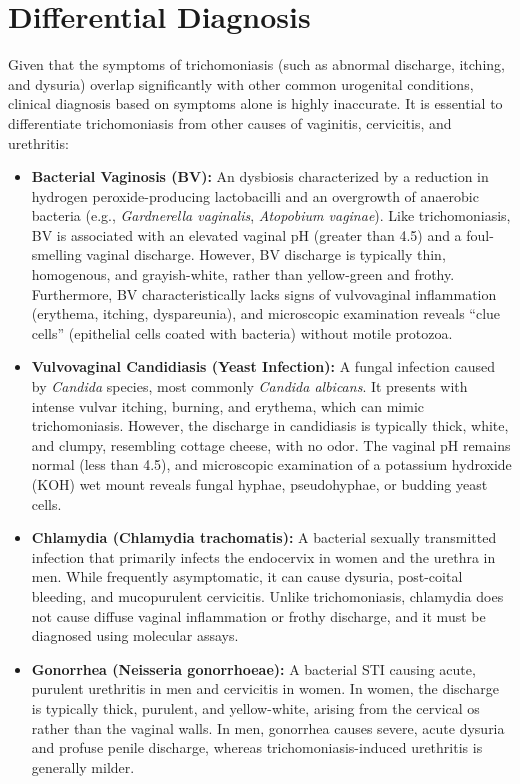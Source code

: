 \section*{Differential Diagnosis}
Given that the symptoms of trichomoniasis (such as abnormal discharge, itching, and dysuria) overlap significantly with other common urogenital conditions, clinical diagnosis based on symptoms alone is highly inaccurate. It is essential to differentiate trichomoniasis from other causes of vaginitis, cervicitis, and urethritis:
\begin{itemize}
    \item \textbf{Bacterial Vaginosis (BV):} An dysbiosis characterized by a reduction in hydrogen peroxide-producing lactobacilli and an overgrowth of anaerobic bacteria (e.g., \textit{Gardnerella vaginalis}, \textit{Atopobium vaginae}). Like trichomoniasis, BV is associated with an elevated vaginal pH (greater than 4.5) and a foul-smelling vaginal discharge. However, BV discharge is typically thin, homogenous, and grayish-white, rather than yellow-green and frothy. Furthermore, BV characteristically lacks signs of vulvovaginal inflammation (erythema, itching, dyspareunia), and microscopic examination reveals ``clue cells'' (epithelial cells coated with bacteria) without motile protozoa.
    \item \textbf{Vulvovaginal Candidiasis (Yeast Infection):} A fungal infection caused by \textit{Candida} species, most commonly \textit{Candida albicans}. It presents with intense vulvar itching, burning, and erythema, which can mimic trichomoniasis. However, the discharge in candidiasis is typically thick, white, and clumpy, resembling cottage cheese, with no odor. The vaginal pH remains normal (less than 4.5), and microscopic examination of a potassium hydroxide (KOH) wet mount reveals fungal hyphae, pseudohyphae, or budding yeast cells.
    \item \textbf{Chlamydia (Chlamydia trachomatis):} A bacterial sexually transmitted infection that primarily infects the endocervix in women and the urethra in men. While frequently asymptomatic, it can cause dysuria, post-coital bleeding, and mucopurulent cervicitis. Unlike trichomoniasis, chlamydia does not cause diffuse vaginal inflammation or frothy discharge, and it must be diagnosed using molecular assays.
    \item \textbf{Gonorrhea (Neisseria gonorrhoeae):} A bacterial STI causing acute, purulent urethritis in men and cervicitis in women. In women, the discharge is typically thick, purulent, and yellow-white, arising from the cervical os rather than the vaginal walls. In men, gonorrhea causes severe, acute dysuria and profuse penile discharge, whereas trichomoniasis-induced urethritis is generally milder.

\end{itemize}

